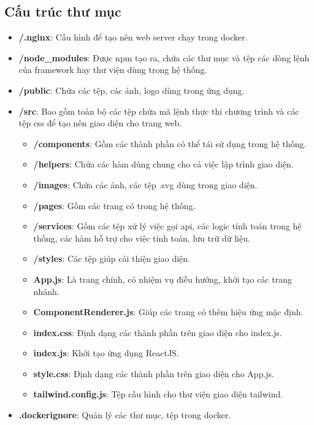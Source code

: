 \documentclass[./../main.tex]{subfiles}
\begin{document}
\subsection{Cấu trúc thư mục}
\begin{itemize}
    \item \textbf{/.nginx}: Cấu hình để tạo nên web server chạy trong docker.
    \item \textbf{/node\_modules}: Được \acrshort{npm}  tạo ra, chứa các thư mục và tệp các dòng lệnh của framework hay thư viện dùng trong hệ thống.
    \item \textbf{/public}: Chứa các tệp, các ảnh, logo dùng trong ứng dụng.
    \item \textbf{/src}: Bao gồm toàn bộ các tệp chứa mã lệnh thực thi chương trình và các tệp css để tạo nên giao diện cho trang web.
    \begin{itemize}
        \item \textbf{/components}: Gồm các thành phần có thể tái sử dụng trong hệ thống.
        \item \textbf{/helpers}: Chứa các hàm dùng chung cho cả việc lập trình giao diện.
        \item \textbf{/images}: Chứa các ảnh, các tệp .svg dùng trong giao diện.
        \item \textbf{/pages}: Gồm các trang có trong hệ thống.
        \item \textbf{/services}: Gồm các tệp xử lý việc gọi \acrshort{api}, các logic tính toán trong hệ thống, các hàm hỗ trợ cho việc tính toán, lưu trữ dữ liệu.
        \item \textbf{/styles}: Các tệp giúp cải thiện giao diện.
        \item \textbf{App.js}: Là trang chính, có nhiệm vụ điều hướng, khởi tạo các trang nhánh.
        \item \textbf{ComponentRenderer.js}: Giúp các trang có thêm hiệu ứng mặc định.
        \item \textbf{index.css}: Định dạng các thành phần trên giao diện cho index.js.
        \item \textbf{index.js}: Khởi tạo ứng dụng ReactJS.
        \item \textbf{style.css}: Định dạng các thành phần trên giao diện cho App.js.
        \item \textbf{tailwind.config.js}: Tệp cấu hình cho thư viện giao diện tailwind.
    \end{itemize}
    \item \textbf{.dockerignore}: Quản lý các thư mục, tệp trong docker.

\end{itemize}
\end{document}

